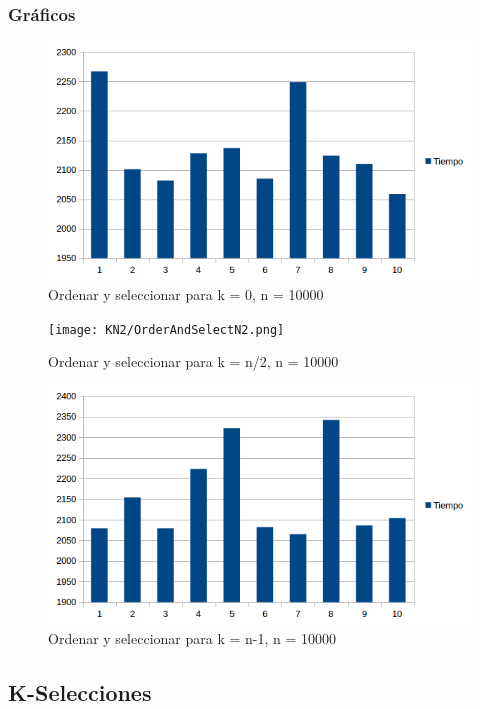 \subsubsection{Gráficos}
\begin{figure}[H]
\centering
\includegraphics[width=\textwidth]{KZero/OrderAndSelectK0.png}
\caption{Ordenar y seleccionar para k = 0, n = 10000}
\end{figure}

\begin{figure}[H]
\centering
\texttt{[image: KN2/OrderAndSelectN2.png]}
\caption{Ordenar y seleccionar para k = n/2, n = 10000}
\end{figure}

\begin{figure}[H]
\centering
\includegraphics[width=\textwidth]{KN/OrderAndSelectN.png}
\caption{Ordenar y seleccionar para k = n-1, n = 10000}
\end{figure}

\newpage
\subsection{K-Selecciones}
